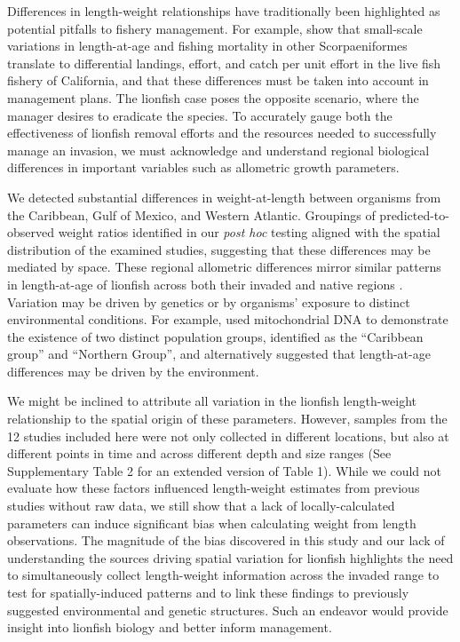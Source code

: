 \documentclass[fleqn,10pt,lineno]{wlpeerj} %
\begin{document}
Differences in length-weight relationships have traditionally been
highlighted as potential pitfalls to fishery management. For example,
\citet{wilson_2012} show that small-scale variations in length-at-age
and fishing mortality in other Scorpaeniformes translate to differential
landings, effort, and catch per unit effort in the live fish fishery of
California, and that these differences must be taken into account in
management plans. The lionfish case poses the opposite scenario, where
the manager desires to eradicate the species. To accurately gauge both
the effectiveness of lionfish removal efforts and the resources needed
to successfully manage an invasion, we must acknowledge and understand
regional biological differences in important variables such as
allometric growth parameters.

We detected substantial differences in weight-at-length between
organisms from the Caribbean, Gulf of Mexico, and Western Atlantic.
Groupings of predicted-to-observed weight ratios identified in our
\emph{post hoc} testing aligned with the spatial distribution of the
examined studies, suggesting that these differences may be mediated by
space. These regional allometric differences mirror similar patterns in
length-at-age of lionfish across both their invaded and native regions
\citep{pusack_2016}. Variation may be driven by genetics or by
organisms' exposure to distinct environmental conditions. For example,
\citet{betancurr_2011} used mitochondrial DNA to demonstrate the
existence of two distinct population groups, identified as the
``Caribbean group'' and ``Northern Group'', and \citet{fogg_2015}
alternatively suggested that length-at-age differences may be driven by
the environment.

We might be inclined to attribute all variation in the lionfish
length-weight relationship to the spatial origin of these parameters.
However, samples from the 12 studies included here were not only
collected in different locations, but also at different points in time
and across different depth and size ranges (See Supplementary Table 2
for an extended version of Table 1). While we could not evaluate how
these factors influenced length-weight estimates from previous studies
without raw data, we still show that a lack of locally-calculated
parameters can induce significant bias when calculating weight from
length observations. The magnitude of the bias discovered in this study
and our lack of understanding the sources driving spatial variation for
lionfish highlights the need to simultaneously collect length-weight
information across the invaded range to test for spatially-induced
patterns and to link these findings to previously suggested
environmental and genetic structures. Such an endeavor would provide
insight into lionfish biology and better inform management.
\end{document}
